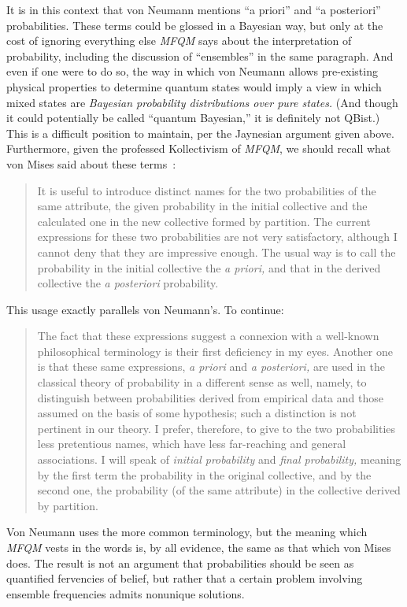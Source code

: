\documentclass[aps,pra,superscriptaddress,12pt,tightenlines,nofootinbib]{revtex4-2}
\newcommand{\MFQM}{\textsl{MFQM}}
\begin{document}
It is in this context that von Neumann mentions ``a priori'' and ``a
posteriori'' probabilities.  These terms could be glossed in a
Bayesian way, but only at the cost of ignoring everything else \MFQM{}
says about the interpretation of probability, including the discussion
of ``ensembles'' in the same paragraph.  And even if one were to do
so, the way in which von Neumann allows pre-existing physical
properties to determine quantum states would imply a view in which
mixed states are \emph{Bayesian probability distributions over pure
  states.}  (And though it could potentially be called ``quantum
Bayesian,'' it is definitely not QBist.)  This is a difficult position
to maintain, per the Jaynesian argument given above.  Furthermore,
given the professed Kollectivism of \MFQM, we should recall what von
Mises said about these terms~\cite[p.\ 46]{Mises1957}:
\begin{quotation}
It is useful to introduce distinct names for the two probabilities of
the same attribute, the given probability in the initial collective
and the calculated one in the new collective formed by partition.  The
current expressions for these two probabilities are not very
satisfactory, although I cannot deny that they are impressive enough.
The usual way is to call the probability in the initial collective the
\emph{a priori,} and that in the derived collective the \emph{a
  posteriori} probability.
\end{quotation}
This usage exactly parallels von Neumann's.  To continue:
\begin{quotation}
\noindent The fact that these expressions suggest a connexion with a
well-known philosophical terminology is their first deficiency in my
eyes.  Another one is that these same expressions, \emph{a priori} and
\emph{a posteriori,} are used in the classical theory of probability
in a different sense as well, namely, to distinguish between
probabilities derived from empirical data and those assumed on the
basis of some hypothesis; such a distinction is not pertinent in our
theory.  I prefer, therefore, to give to the two probabilities less
pretentious names, which have less far-reaching and general
associations.  I will speak of \emph{initial probability} and
\emph{final probability,} meaning by the first term the probability in
the original collective, and by the second one, the probability (of
the same attribute) in the collective derived by partition.
\end{quotation}
Von Neumann uses the more common terminology, but the meaning which
\MFQM{} vests in the words is, by all evidence, the same as that which
von Mises does.  The result is not an argument that probabilities
should be seen as quantified fervencies of belief, but rather that a
certain problem involving ensemble frequencies admits nonunique
solutions.
\end{document}
